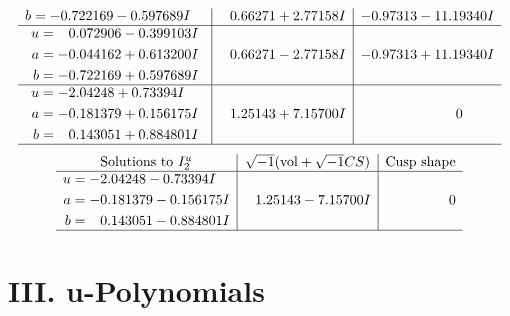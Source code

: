 \documentclass[1p]{elsarticle_modified}
\theoremstyle{definition}
\newcommand{\I}{\sqrt{-1}}
\begin{document}
$$\begin{array}{c|c|c}
\begin{aligned}
b &= -0.722169 - 0.597689 I\end{aligned}
 & \phantom{-}0.66271 + 2.77158 I & -0.97313 - 11.19340 I \\ \hline\begin{aligned}
u &= \phantom{-}0.072906 - 0.399103 I \\
a &= -0.044162 + 0.613200 I \\
b &= -0.722169 + 0.597689 I\end{aligned}
 & \phantom{-}0.66271 - 2.77158 I & -0.97313 + 11.19340 I \\ \hline\begin{aligned}
u &= -2.04248 + 0.73394 I \\
a &= -0.181379 + 0.156175 I \\
b &= \phantom{-}0.143051 + 0.884801 I\end{aligned}
 & \phantom{-}1.25143 + 7.15700 I & \phantom{-0.000000 } 0\\
 \hline 
 \end{array}$$\newpage$$\begin{array}{c|c|c}  
\text{Solutions to }I^u_{2}& \I (\text{vol} + \sqrt{-1}CS) & \text{Cusp shape}\\
 \hline 
\begin{aligned}
u &= -2.04248 - 0.73394 I \\
a &= -0.181379 - 0.156175 I \\
b &= \phantom{-}0.143051 - 0.884801 I\end{aligned}
 & \phantom{-}1.25143 - 7.15700 I & \phantom{-0.000000 } 0\\
 \hline 
 \end{array}$$\newpage
\newpage\renewcommand{\arraystretch}{1}
\centering \section*{ III. u-Polynomials}
\end{document}
